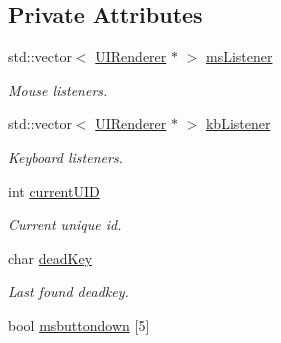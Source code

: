 \subsection*{Private Attributes}
\begin{DoxyCompactItemize}
\item 
\hypertarget{class_u_i_system_af9a599a508924e7949de438b95e2ed2f}{std\-::vector$<$ \hyperlink{class_u_i_renderer}{U\-I\-Renderer} $\ast$ $>$ \hyperlink{class_u_i_system_af9a599a508924e7949de438b95e2ed2f}{ms\-Listener}}\label{class_u_i_system_af9a599a508924e7949de438b95e2ed2f}

\begin{DoxyCompactList}\small\item\em Mouse listeners. \end{DoxyCompactList}\item 
\hypertarget{class_u_i_system_ae62a4dc19872c94de26957ccccec9112}{std\-::vector$<$ \hyperlink{class_u_i_renderer}{U\-I\-Renderer} $\ast$ $>$ \hyperlink{class_u_i_system_ae62a4dc19872c94de26957ccccec9112}{kb\-Listener}}\label{class_u_i_system_ae62a4dc19872c94de26957ccccec9112}

\begin{DoxyCompactList}\small\item\em Keyboard listeners. \end{DoxyCompactList}\item 
\hypertarget{class_u_i_system_afa67c850ac0fcebe6d5ce507c2b8fb0b}{int \hyperlink{class_u_i_system_afa67c850ac0fcebe6d5ce507c2b8fb0b}{current\-U\-I\-D}}\label{class_u_i_system_afa67c850ac0fcebe6d5ce507c2b8fb0b}

\begin{DoxyCompactList}\small\item\em Current unique id. \end{DoxyCompactList}\item 
\hypertarget{class_u_i_system_a56a33b6591efa7ee02df81c02c64e7d5}{char \hyperlink{class_u_i_system_a56a33b6591efa7ee02df81c02c64e7d5}{dead\-Key}}\label{class_u_i_system_a56a33b6591efa7ee02df81c02c64e7d5}

\begin{DoxyCompactList}\small\item\em Last found deadkey. \end{DoxyCompactList}\item 
\hypertarget{class_u_i_system_a4b44c8ec919f89201bd36f4652f28751}{bool \hyperlink{class_u_i_system_a4b44c8ec919f89201bd36f4652f28751}{msbuttondown} \mbox{[}5\mbox{]}}\label{class_u_i_system_a4b44c8ec919f89201bd36f4652f28751}


\end{DoxyCompactItemize}
